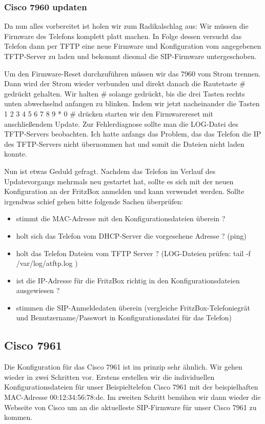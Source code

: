 \documentclass[a4paper,12pt]{scrbook}
\begin{document}
\subsubsection{Cisco 7960 updaten}
Da nun alles vorbereitet ist holen wir zum Radikalschlag aus: Wir müssen die Firmware des Telefons komplett platt machen. In Folge dessen versucht das
Telefon dann per TFTP eine neue Firmware und Konfiguration vom angegebenen TFTP-Server zu laden und bekommt diesmal die SIP-Firmware untergeschoben.

Um den Firmware-Reset durchzuführen müssen wir das 7960 vom Strom trennen. Dann wird der Strom wieder verbunden und direkt danach die Rautetaste \# gedrückt gehalten.
Wir halten \# solange gedrückt, bis die drei Tasten rechts unten abwechselnd anfangen zu blinken. Indem wir jetzt nacheinander die Tasten 1 2 3 4 5 6 7 8 9 * 0 \# drücken starten wir den
Firmwarereset mit anschließendem Update. Zur Fehlerdiagnose sollte man die LOG-Datei des TFTP-Servers beobachten. Ich hatte anfangs das Problem, das das Telefon die IP des TFTP-Servers
nicht übernommen hat und somit die Dateien nicht laden konnte. 

Nun ist etwas Geduld gefragt. Nachdem das Telefon im Verlauf des Updatevorgangs mehrmals neu gestartet hat, sollte es sich mit der neuen Konfiguration an der FritzBox anmelden und kann 
verwendet werden. Sollte irgendwas schief gehen bitte folgende Sachen überprüfen:

\begin{itemize}
 \item stimmt die MAC-Adresse mit den Konfigurationsdateien überein ?
 \item holt sich das Telefon vom DHCP-Server die vorgesehene Adresse ? (ping)
 \item holt das Telefon Dateien vom TFTP Server ? (LOG-Dateien prüfen: tail -f /var/log/atftp.log )
 \item ist die IP-Adresse für die FritzBox richtig in den Konfigurationsdateien ausgewiesen ?
 \item stimmen die SIP-Anmeldedaten überein (vergleiche FritzBox-Telefoniegrät und Benutzername/Passwort in Konfigurationsdatei für das Telefon) 
\end{itemize}


\subsection{Cisco 7961}
Die Konfiguration für das Cisco 7961 ist im prinzip sehr ähnlich. Wir gehen wieder in zwei Schritten vor. Erstens erstellen wir die individuellen Konfigurationsdateien für unser 
Beispieltelefon Cisco 7961 mit der beispielhaften MAC-Adresse 00:12:34:56:78:de. Im zweiten Schritt bemühen wir dann wieder die Webseite von Cisco um an die aktuelleste SIP-Firmware für unser
Cisco 7961 zu kommen.
\end{document}
